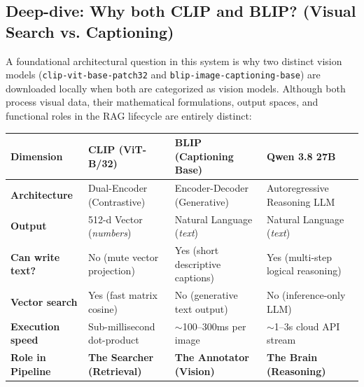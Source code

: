 \documentclass[11pt,a4paper]{article}
\begin{document}
\subsection{Deep-dive: Why both CLIP and BLIP? (Visual Search vs. Captioning)}
A foundational architectural question in this system is why two distinct vision models (\texttt{clip-vit-base-patch32} and \texttt{blip-image-captioning-base}) are downloaded locally when both are categorized as vision models. Although both process visual data, their mathematical formulations, output spaces, and functional roles in the RAG lifecycle are entirely distinct:

{\footnotesize
\begin{center}
\begin{tabular}{@{}lp{3.8cm}p{4.2cm}p{3.8cm}@{}}
\toprule
Dimension & \textbf{CLIP} (ViT-B/32) & \textbf{BLIP} (Captioning Base) & \textbf{Qwen 3.8 27B} \\
\midrule
\textbf{Architecture} & Dual-Encoder (Contrastive) & Encoder-Decoder (Generative) & Autoregressive Reasoning LLM \\
\textbf{Output} & 512-d Vector (\emph{numbers}) & Natural Language (\emph{text}) & Natural Language (\emph{text}) \\
\textbf{Can write text?} & No (mute vector projection) & Yes (short descriptive captions) & Yes (multi-step logical reasoning) \\
\textbf{Vector search} & Yes (fast matrix cosine) & No (generative text output) & No (inference-only LLM) \\
\textbf{Execution speed} & Sub-millisecond dot-product & $\sim$100--300ms per image & $\sim$1--3s cloud API stream \\
\textbf{Role in Pipeline} & \textbf{The Searcher (Retrieval)} & \textbf{The Annotator (Vision)} & \textbf{The Brain (Reasoning)} \\
\bottomrule
\end{tabular}
\end{center}
}
\end{document}

